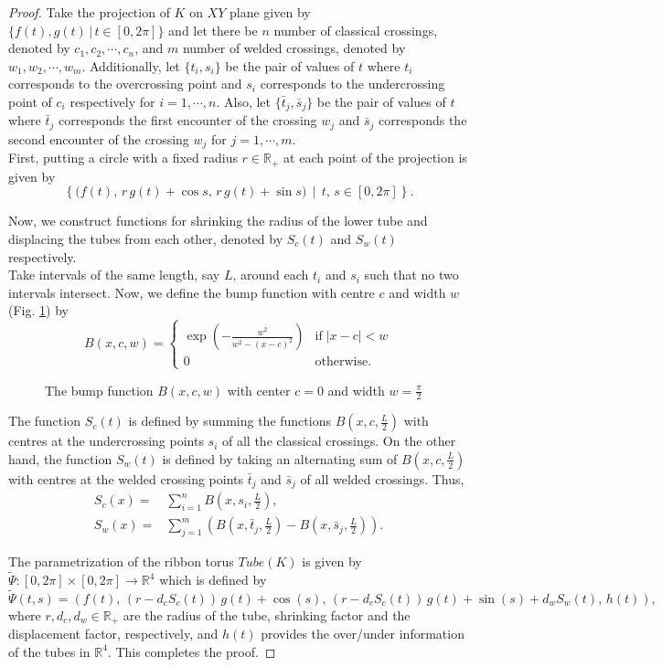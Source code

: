 \documentclass[10pt,a4paper]{amsart}
\newcommand{\LP}{\left(}
\newcommand{\R}{\mathbb R}
\newcommand{\RP}{\right)}
\begin{document}
\begin{proof}
	Take the projection of $K$ on $XY$ plane given by 
	$\{f(t),g(t) \, \vert \, t \in[0,2\pi]\}$
	and let there be $n$ number of classical crossings, denoted by $c_{1},c_{2},\cdots,c_{n}$, and $m$ number of welded crossings, denoted by $w_{1},w_{2},\cdots,w_{m}$. Additionally, let $\{t_{i},s_{i}\}$  be the pair of values of $t$ where $t_{i}$ corresponds to the overcrossing point and $s_{i}$ corresponds to the undercrossing point of $c_{i}$ respectively for $i=1,\cdots, n$. Also, let $\{\bar{t}_{j},\bar{s}_{j}\}$  be the pair of values of $t$ where $\bar{t}_{j}$ corresponds the first encounter of the crossing $w_{j}$ and $\bar{s}_{j}$ corresponds the second encounter of the crossing $w_{j}$ for $j=1,\cdots, m$. \\
	First, putting a circle with a fixed radius $r \in \R_{+}$ at each point of the projection is given by
	\begin{equation*}
		\left\{\big(f(t),\,r \,g(t)+\cos s,\,r\, g(t)+\sin s \big)\, \middle| \, t,\,s \in[0,2\pi]\right\}.
	\end{equation*}
	
	Now, we construct functions for shrinking the radius of the lower tube and displacing the tubes from each other, denoted by $S_{c}(t)$ and $S_{w}(t)$ respectively.\\
	Take intervals of the same length, say $L$, around each $t_{i}$ and $s_{i}$ such that no two intervals intersect. Now, we define the bump function with centre $c$ and width $w$ (Fig. \ref{Fig:bump}) by
	\[B(x,c,w)=
	\begin{cases}
		\exp\left(-\frac{w^2}{w^2-(x-c)^2}\right) & \text{if}\; | x-c| <w \\
		0 & \text{otherwise.} 
	\end{cases}\]
		\begin{figure}[H]
		\centering 
		
		\caption{The bump function $B(x,c,w)$ with center $c=0$ and width $w= \frac{\pi}{2}$}
		\label{Fig:bump}
	\end{figure}
	The function $S_{c}(t)$ is defined by summing the functions $B(x,c,\frac{L}{2})$ with centres at the undercrossing points $s_{i}$ of all the classical crossings. On the other hand, the function $S_{w}(t)$ is defined by taking an alternating sum of $B(x,c,\frac{L}{2})$ with centres at the welded crossing points $\bar{t}_{j}$ and  $\bar{s}_{j}$ of all welded crossings. Thus,
		\begin{align*}
			S_{c}(x)=& \sum_{i=1}^{n} B(x,s_{i},\frac{L}{2}),\\
			S_{w}(x)=& \sum_{j=1}^{m} \LP B(x,\bar{t}_{j},\frac{L}{2})-B(x,\bar{s}_{j},\frac{L}{2})\RP.
		\end{align*}

	\noindent
	The  parametrization of the ribbon torus $Tube(K)$ is given by $\tilde{\Psi}: [0,2\pi]\times [0,2\pi] \rightarrow \R^4$ which is defined by
	\[\tilde{\Psi}(t,s)=\LP f(t),\,(r-d_{c}S_{c}(t))\,g(t)+\cos(s),\,(r-d_{c}S_{c}(t))\,g(t)+\sin(s)+d_{w}S_{w}(t),\, h(t)\RP,\]
	where $r, d_{c}, d_{w} \in \R_{+} $ are the radius of the tube, shrinking factor and the displacement factor, respectively, and $h(t)$ provides the over/under information of the tubes in $\R^{4}$. This completes the proof. 
\end{proof}
\end{document}
